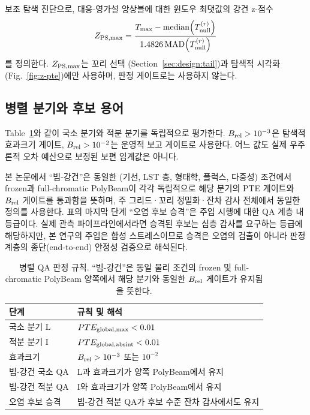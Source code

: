 \documentclass[final,5p,times]{elsarticle}
\begin{document}
보조 탐색 진단으로, 대응-영가설 앙상블에 대한 윈도우 최댓값의
강건 z-점수
\begin{equation}
 Z_{\rm PS,max}=
 \frac{T_{\rm max}-\mathrm{median}\!\left(T_{\rm null}^{(r)}\right)}
      {1.4826\,\mathrm{MAD}\!\left(T_{\rm null}^{(r)}\right)}
\end{equation}
를 정의한다. $Z_{\rm PS,max}$는 꼬리 선택
(Section~\ref{sec:design:tail})과 탐색적 시각화
(Fig.~\ref{fig:z-pte})에만 사용하며, 판정 게이트로는 사용하지
않는다.

\subsection{병렬 분기와 후보 용어}
\label{sec:hierarchy}

Table~\ref{tab:hierarchy}와 같이 국소 분기와 적분 분기를 독립적으로
평가한다. $B_{\rm rel}>10^{-3}$은 탐색적 효과크기 게이트,
$B_{\rm rel}>10^{-2}$는 운영적 보고 게이트로 사용한다. 어느 값도
실제 우주론적 오차 예산으로 보정된 보편 임계값은 아니다.

본 논문에서 ``빔-강건''은 동일한 (기선, LST 층, 형태학, 플럭스,
다중성) 조건에서 frozen과 full-chromatic PolyBeam이 각각
독립적으로 해당 분기의 PTE 게이트와 $B_{\rm rel}$ 게이트를
통과함을 뜻하며, 주 그리드·꼬리 정밀화·잔차 감사 전체에서 동일한
정의를 사용한다. 표의 마지막 단계 ``오염 후보 승격''은 주입
시행에 대한 QA 계층 내 등급이다. 실제 관측 파이프라인에서라면
승격된 후보는 심층 감사를 요구하는 등급에 해당하지만, 본 연구의
주입은 합성 스트레스이므로 승격은 오염의 검출이 아니라 판정 계층의
종단(end-to-end) 안정성 검증으로 해석된다.

\begin{table}[!t]
\centering
\small
\caption{병렬 QA 판정 규칙. ``빔-강건''은 동일 물리 조건의 frozen 및
full-chromatic PolyBeam 양쪽에서 해당 분기와 동일한
$B_{\rm rel}$ 게이트가 유지됨을 뜻한다.}
\label{tab:hierarchy}
\begin{tabularx}{\linewidth}{lX}
\toprule
단계 & 규칙 및 해석 \\
\midrule
국소 분기 L & $PTE_{\rm global,max}<0.01$ \\
적분 분기 I & $PTE_{\rm global,absint}<0.01$ \\
효과크기 & $B_{\rm rel}>10^{-3}$ 또는 $10^{-2}$ \\
빔-강건 국소 QA & L과 효과크기가 양쪽 PolyBeam에서 유지 \\
빔-강건 적분 QA & I와 효과크기가 양쪽 PolyBeam에서 유지 \\
오염 후보 승격 & 빔-강건 적분 QA가 후보 수준 잔차 감사에서도 유지 \\
\bottomrule
\end{tabularx}
\end{table}
\end{document}
